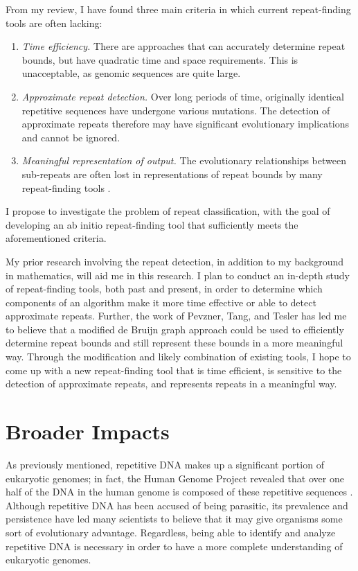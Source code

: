 \documentclass[12pt]{article}
\begin{document}
From my review, I have found three main criteria in which current repeat-finding tools are often lacking:
\begin{enumerate}
\item{\textit{Time efficiency.} There are approaches that can accurately determine repeat bounds, but have quadratic time and space requirements. This is unacceptable, as genomic sequences are quite large. }
\item{\textit{Approximate repeat detection.} Over long periods of time, originally identical repetitive sequences have undergone various mutations. The detection of approximate repeats therefore may have significant evolutionary implications and cannot be ignored. }
\item{\textit{Meaningful representation of output.} The evolutionary relationships between sub-repeats are often lost in representations of repeat bounds by many repeat-finding tools \cite{pevzner2004de-novo}. }
\end{enumerate}
I propose to investigate the problem of repeat classification, with the goal of developing an ab initio repeat-finding tool that sufficiently meets the aforementioned criteria.

My prior research involving the repeat detection, in addition to my background in mathematics, will aid me in this research. I plan to conduct an in-depth study of repeat-finding tools, both past and present, in order to determine which components of an algorithm make it more time effective or able to detect approximate repeats. Further, the work of Pevzner, Tang, and Tesler \cite{pevzner2004de-novo} has led me to believe that a modified de Bruijn graph approach could be used to efficiently determine repeat bounds and still represent these bounds in a more meaningful way. Through the modification and likely combination of existing tools, I hope to come up with a new repeat-finding tool that is time efficient, is sensitive to the detection of approximate repeats, and represents repeats in a meaningful way.

\section*{Broader Impacts}
As previously mentioned, repetitive DNA makes up a significant portion of eukaryotic genomes; in fact, the Human Genome Project revealed that over one half of the DNA in the human genome is composed of these repetitive sequences \cite{britten1968repeated, lander2001initial}. Although repetitive DNA has been accused of being parasitic, its prevalence and persistence have led many scientists to believe that it may give organisms some sort of evolutionary advantage\cite{saha2008computational}. Regardless, being able to identify and analyze repetitive DNA is necessary in order to have a more complete understanding of eukaryotic genomes.






\end{document}
